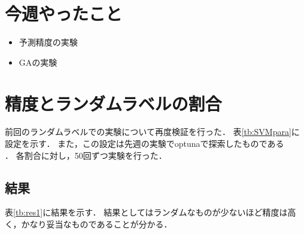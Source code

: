 \documentclass[twocolumn]{jarticle}     %
\begin{document}


\section{今週やったこと}

\begin{itemize}
	\item 予測精度の実験
	\item GAの実験
\end{itemize}

\section{精度とランダムラベルの割合}
前回のランダムラベルでの実験について再度検証を行った．
表\ref{tb:SVMpara}に設定を示す．
また，この設定は先週の実験でoptunaで探索したものである\\．
各割合に対し，50回ずつ実験を行った．
\begin{table}[h]
	\centering
	\caption{SVMの設定\label{tb:SVMpara}}
\end{table}

\subsection{結果}
表\ref{tb:res1}に結果を示す．
結果としてはランダムなものが少ないほど精度は高く，かなり妥当なものであることが分かる．
\end{document}

